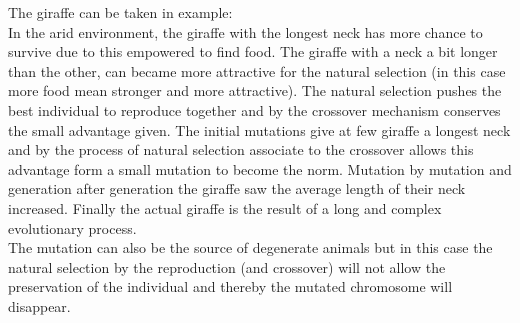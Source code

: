 The giraffe can be taken in example:\\
 In the arid environment, the giraffe with the longest neck has more chance to survive due to this empowered to find food. The giraffe with a neck a bit longer than the other, can became more attractive for the natural selection (in this case more food mean stronger and more attractive). The natural selection pushes the best individual to reproduce together and by the crossover mechanism conserves the small advantage given. The initial mutations give at few giraffe a longest neck and by the process of natural selection associate to the crossover allows this advantage form a small mutation to become the norm. Mutation by mutation and generation after generation the giraffe  saw the average length of their neck increased. Finally the actual giraffe is the result of a long and complex evolutionary process. \\ 
The mutation can also be the source of degenerate animals but in this case the natural selection  by the reproduction (and crossover) will not allow the preservation of the individual and thereby the mutated chromosome will disappear.\\ 
